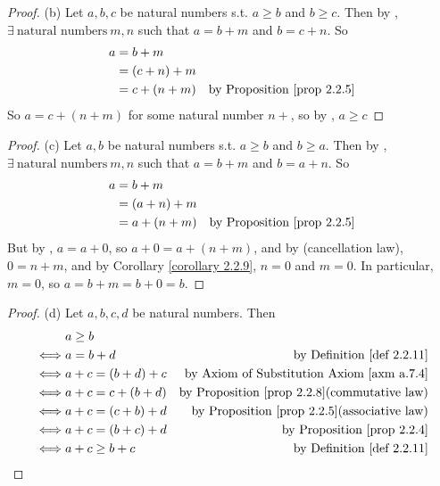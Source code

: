 \begin{proof}{(b)}
Let \(a, b, c\) be natural numbers s.t. \(a \geq b\) and \(b \geq c\). Then by , \(\exists\ \text{natural numbers}\ m, n\) such that \(a = b + m\) and \(b = c + n\). So
\begin{align*}
    a & = b + m & \\
      & = (c + n) + m & \\
      & = c + (n + m) & \text{by \PROP{2.2.5}}\\
\end{align*}
So \(a = c + (n + m)\) for some natural number \(n + \), so by , \(a \geq c\)
\end{proof}
\begin{proof}{(c)}
Let \(a, b\) be natural numbers s.t. \(a \geq b\) and \(b \geq a\). Then by , \(\exists\ \text{natural numbers}\ m, n\) such that \(a = b + m\) and \(b = a + n\). So
\begin{align*}
    a & = b + m & \\
      & = (a + n) + m & \\
      & = a + (n + m) & \text{by \PROP{2.2.5}}\\
\end{align*}
But by , \(a = a + 0\), so \(a + 0 = a + (n + m)\), and by  (cancellation law), \(0 = n + m\), and by Corollary \ref{corollary 2.2.9}, \(n = 0\) and \(m = 0\). In particular, \(m = 0\), so \(a = b + m = b + 0 = b\).
\end{proof}
\begin{proof}{(d)}
Let \(a, b, c, d\) be natural numbers. Then
\begin{align*}
         & a \geq b \\
    \iff & a = b + d             & \text{by \DEF{2.2.11}} \\
    \iff & a + c = (b + d) + c   & \text{by Axiom of Substitution \AXM{a.7.4}} \\ 
    \iff & a + c = c + (b + d)   & \text{by \PROP{2.2.8}(commutative law)} \\
    \iff & a + c = (c + b) + d   & \text{by \PROP{2.2.5}(associative law)} \\
    \iff & a + c = (b + c) + d   & \text{by \PROP{2.2.4}} \\
    \iff & a + c \geq b + c      & \text{by \DEF{2.2.11}}
\end{align*}
\end{proof}
